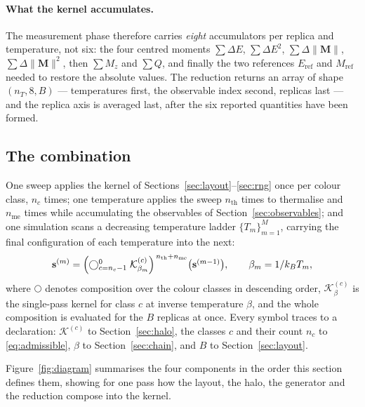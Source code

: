 \documentclass[11pt,a4paper]{article}
\newcommand{\vs}{\mathbf{s}}
\newcommand{\vM}{\mathbf{M}}
\begin{document}
\paragraph{What the kernel accumulates.} The measurement phase therefore carries
\emph{eight} accumulators per replica and temperature, not six: the four
centred moments $\sum \Delta E$, $\sum \Delta E^2$,
$\sum \Delta \lVert\vM\rVert$, $\sum \Delta \lVert\vM\rVert^2$, then $\sum M_z$
and $\sum Q$, and finally the two references $E_{\mathrm{ref}}$ and
$M_{\mathrm{ref}}$ needed to restore the absolute values. The reduction returns
an array of shape $(n_T, 8, B)$ --- temperatures first, the observable index
second, replicas last --- and the replica axis is averaged last, after the six
reported quantities have been formed.

\subsection{The combination}
\label{sec:combination}

One sweep applies the kernel of Sections~\ref{sec:layout}--\ref{sec:rng} once
per colour class, $n_c$ times; one temperature applies the sweep
$n_{\mathrm{th}}$ times to thermalise and $n_{\mathrm{me}}$ times while
accumulating the observables of Section~\ref{sec:observables}; and one simulation
scans a decreasing temperature ladder $\{T_m\}_{m=1}^{M}$, carrying the final
configuration of each temperature into the next:
%
\begin{equation}
\vs^{(m)} = \Bigl(\textstyle\bigcirc_{c = n_c - 1}^{0}\;
  \mathcal{K}^{(c)}_{\beta_m}\Bigr)^{\,n_{\mathrm{th}} + n_{\mathrm{me}}}
  \bigl(\vs^{(m-1)}\bigr),
\qquad \beta_m = 1/k_B T_m ,
\label{eq:combination}
\end{equation}
%
where $\bigcirc$ denotes composition over the colour classes in descending
order, $\mathcal{K}^{(c)}_\beta$ is the single-pass kernel for class $c$ at
inverse temperature $\beta$, and the whole composition is evaluated for the $B$
replicas at once. Every symbol traces to a declaration: $\mathcal{K}^{(c)}$ to
Section~\ref{sec:halo}, the classes $c$ and their count $n_c$ to
\eqref{eq:admissible}, $\beta$ to Section~\ref{sec:chain}, and $B$ to
Section~\ref{sec:layout}.

Figure~\ref{fig:diagram} summarises the four components in the order this
section defines them, showing for one pass how the layout, the halo, the
generator and the reduction compose into the kernel.
\end{document}

